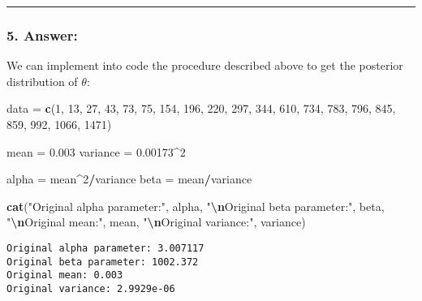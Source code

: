 \documentclass[
]{article}
\newenvironment{Shaded}{\begin{snugshade}}{\end{snugshade}}
\newcommand{\DecValTok}[1]{\textcolor[rgb]{0.00,0.00,0.81}{#1}}
\newcommand{\FloatTok}[1]{\textcolor[rgb]{0.00,0.00,0.81}{#1}}
\newcommand{\FunctionTok}[1]{\textcolor[rgb]{0.13,0.29,0.53}{\textbf{#1}}}
\newcommand{\NormalTok}[1]{#1}
\newcommand{\OtherTok}[1]{\textcolor[rgb]{0.56,0.35,0.01}{#1}}
\newcommand{\SpecialCharTok}[1]{\textcolor[rgb]{0.81,0.36,0.00}{\textbf{#1}}}
\newcommand{\StringTok}[1]{\textcolor[rgb]{0.31,0.60,0.02}{#1}}
\begin{document}
\begin{center}\rule{0.5\linewidth}{0.5pt}\end{center}

\hypertarget{answer-8}{%
\subsubsection{5. Answer:}\label{answer-8}}

We can implement into code the procedure described above to get the
posterior distribution of \(\theta\):

\begin{Shaded}
\begin{Highlighting}[]
\NormalTok{data }\OtherTok{=} \FunctionTok{c}\NormalTok{(}\DecValTok{1}\NormalTok{, }\DecValTok{13}\NormalTok{, }\DecValTok{27}\NormalTok{, }\DecValTok{43}\NormalTok{, }\DecValTok{73}\NormalTok{, }\DecValTok{75}\NormalTok{, }\DecValTok{154}\NormalTok{, }\DecValTok{196}\NormalTok{, }\DecValTok{220}\NormalTok{, }\DecValTok{297}\NormalTok{,}
    \DecValTok{344}\NormalTok{, }\DecValTok{610}\NormalTok{, }\DecValTok{734}\NormalTok{, }\DecValTok{783}\NormalTok{, }\DecValTok{796}\NormalTok{, }\DecValTok{845}\NormalTok{, }\DecValTok{859}\NormalTok{, }\DecValTok{992}\NormalTok{, }\DecValTok{1066}\NormalTok{, }\DecValTok{1471}\NormalTok{)}

\NormalTok{mean }\OtherTok{=} \FloatTok{0.003}
\NormalTok{variance }\OtherTok{=} \FloatTok{0.00173}\SpecialCharTok{\^{}}\DecValTok{2}

\NormalTok{alpha }\OtherTok{=}\NormalTok{ mean}\SpecialCharTok{\^{}}\DecValTok{2}\SpecialCharTok{/}\NormalTok{variance}
\NormalTok{beta }\OtherTok{=}\NormalTok{ mean}\SpecialCharTok{/}\NormalTok{variance}

\FunctionTok{cat}\NormalTok{(}\StringTok{"Original alpha parameter:"}\NormalTok{, alpha, }\StringTok{"}\SpecialCharTok{\textbackslash{}n}\StringTok{Original beta parameter:"}\NormalTok{,}
\NormalTok{    beta, }\StringTok{"}\SpecialCharTok{\textbackslash{}n}\StringTok{Original mean:"}\NormalTok{, mean, }\StringTok{"}\SpecialCharTok{\textbackslash{}n}\StringTok{Original variance:"}\NormalTok{,}
\NormalTok{    variance)}
\end{Highlighting}
\end{Shaded}

\begin{verbatim}
Original alpha parameter: 3.007117 
Original beta parameter: 1002.372 
Original mean: 0.003 
Original variance: 2.9929e-06
\end{verbatim}
\end{document}
